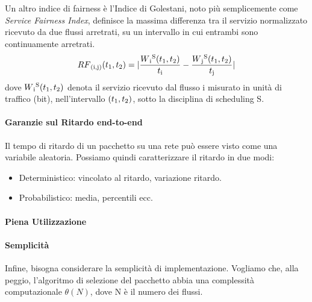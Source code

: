 \documentclass{article}
\begin{document}
Un altro indice di fairness è l'Indice di Golestani, noto più semplicemente come \textit{Service Fairness Index}, definisce la massima differenza tra il servizio normalizzato ricevuto da due flussi arretrati, su un intervallo in cui entrambi sono continuamente arretrati.\\
\[
    RF\textsubscript{(i,j)}(t\textsubscript{1}, t\textsubscript{2}) = | \frac{W\textsubscript{i}\textsuperscript{S}(t\textsubscript{1}, t\textsubscript{2})}{t\textsubscript{i}} - \frac{W\textsubscript{j}\textsuperscript{S}(t\textsubscript{1}, t\textsubscript{2})}{t\textsubscript{j}} |
\]
dove \( W\textsubscript{i}\textsuperscript{S}(t\textsubscript{1}, t\textsubscript{2}) \) denota il servizio ricevuto dal flusso i misurato in unità di traffico (bit), nell'intervallo \( (t\textsubscript{1}, t\textsubscript{2}) \), sotto la disciplina di scheduling S.

\paragraph{Garanzie sul Ritardo end-to-end} Il tempo di ritardo di un pacchetto su una rete può essere visto come una variabile aleatoria. Possiamo quindi caratterizzare il ritardo in due modi:
\begin{itemize}
    \item Deterministico: vincolato al ritardo, variazione ritardo.
    \item Probabilistico: media, percentili ecc.
\end{itemize}

\paragraph{Piena Utilizzazione}
\paragraph{Semplicità} Infine, bisogna considerare la semplicità di implementazione. Vogliamo che, alla peggio, l'algoritmo di selezione del pacchetto abbia una complessità computazionale \(\displaystyle\theta(N)\), dove N è il numero dei flussi.

\newpage
\end{document}
